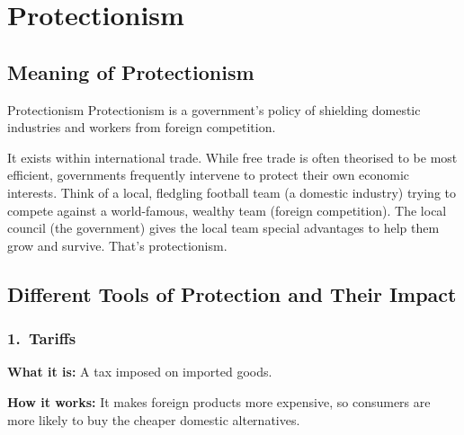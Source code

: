 \documentclass[11pt, a4paper, twoside]{book}
\begin{document}
\section{Protectionism}

\subsection{Meaning of Protectionism}

\begin{keyterm}{Protectionism}
Protectionism is a government's policy of shielding domestic industries and workers from foreign competition.
\end{keyterm}

It exists within international trade. While free trade is often theorised to be most efficient, governments frequently intervene to protect their own economic interests. Think of a local, fledgling football team (a domestic industry) trying to compete against a world-famous, wealthy team (foreign competition). The local council (the government) gives the local team special advantages to help them grow and survive. That's protectionism.

\subsection{Different Tools of Protection and Their Impact}

\subsubsection{1.\ Tariffs}

\textbf{What it is:} A tax imposed on imported goods.

\textbf{How it works:} It makes foreign products more expensive, so consumers are more likely to buy the cheaper domestic alternatives.
\end{document}
